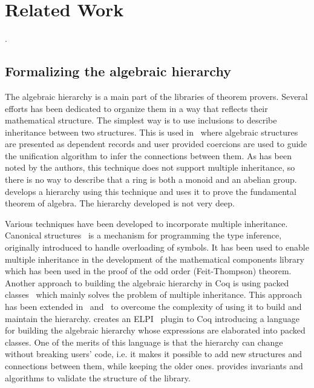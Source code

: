 \chapter{Related Work}
\label{ch:relatedwork}
. 
\section{Formalizing the algebraic hierarchy}
The algebraic hierarchy is a main part of the libraries of theorem provers. Several efforts has been dedicated to organize them in a way that reflects their mathematical structure. 
The simplest way is to use inclusions to describe inheritance between two structures. This is used in~\cite{Geuvers2002} where algebraic structures are presented as dependent records and user provided coercions are used to guide the unification algorithm to infer the connections between them. As has been noted by the authors, this technique does not support multiple inheritance, so there is no way to describe that a ring is both a monoid and an abelian group. \cite{Geuvers2002} develops a hierarchy using this technique and uses it to prove the fundamental theorem of algebra. The hierarchy developed is not very deep. 

Various techniques have been developed to incorporate multiple inheritance. Canonical structures~\cite{canonical2013} is a mechanism for programming the type inference, originally introduced to handle overloading of symbols. It has been used to enable multiple inheritance in the development of the mathematical components library~\cite{mathCompLib} which has been used in the proof of the odd order (Feit-Thompson) theorem. 
% 
Another approach to building the algebraic hierarchy in Coq is using packed classes~\cite{Gonthier2009} which mainly solves the problem of multiple inheritance. This approach has been extended in~\cite{cohen2020hierarchy} and~\cite{sakaguchi2020validating} to overcome the complexity of using it to build and maintain the hierarchy. \cite{cohen2020hierarchy} creates an ELPI~\cite{elpi,elpiForCoq} plugin to Coq introducing a language for building the algebraic hierarchy whose expressions are elaborated into packed classes. One of the merits of this language is that the hierarchy can change without breaking users' code, i.e. it makes it possible to add new structures and connections between them, while keeping the older ones. \cite{sakaguchi2020validating} provides invariants and algorithms to validate the structure of the library.  

